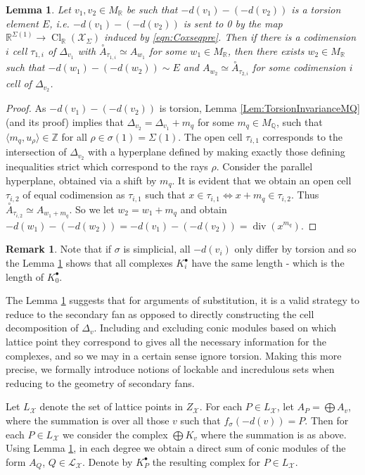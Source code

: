 \documentclass[reqno, 12pt]{amsart}
\newtheorem{lemma}[theorem]{Lemma}
\theoremstyle{definition}
\newtheorem{remark}[theorem]{Remark}
\numberwithin{equation}{section}
\newcommand{\Z}{\mathbb{Z}}
\newcommand{\R}{\mathbb{R}}
\newcommand{\Q}{\mathbb{Q}}
\newcommand{\opA}{\overset{\circ}{A}}
\begin{document}
\begin{lemma}
    \label{Lem:TorsionCellsPropagate}
    Let $v_1, v_2\in M_\R$ be such that $-d(v_1)-(-d(v_2))$ is a torsion element $E$, i.e. $-d(v_1)-(-d(v_2))$ is sent to 0 by the map $\R^{\Sigma(1)}\rightarrow \operatorname{Cl}_\R(\mathcal{X}_\Sigma)$ induced by \ref{eqn:Coxseqpre}. Then if there is a codimension $i$ cell $\tau_{1,i}$ of $\Delta_{v_1}$ with $\opA_{\tau_{1,i}}\simeq A_{w_1}$ for some $w_1\in M_\R$, then there exists $w_2\in M_\R$ such that $-d(w_1)-(-d(w_2))\sim E$ and $A_{w_2}\simeq \opA_{\tau_{2,i}}$ for some codimension $i$ cell of $\Delta_{v_2}$.
\end{lemma}
\begin{proof}
    As $-d(v_1)-(-d(v_2))$ is torsion, Lemma \ref{Lem:TorsionInvarianceMQ} (and its proof) implies that $\Delta_{v_2}=\Delta_{v_1}+m_q$ for some $m_q\in M_\Q$, such that $\langle m_q, u_\rho\rangle\in\Z$ for all $\rho\in\sigma(1)=\Sigma(1)$. The open cell $\tau_{i,1}$ corresponds to the intersection of $\Delta_{v_2}$ with a hyperplane defined by making exactly those defining inequalities strict which correspond to the rays $\rho$. Consider the parallel hyperplane, obtained via a shift by $m_q$. It is evident that we obtain an open cell $\tau_{i,2}$ of equal codimension as $\tau_{i,1}$ such that $x\in \tau_{i,1}\Leftrightarrow x+m_q\in \tau_{i,2}$. Thus $\opA_{\tau_{i,2}}\simeq A_{w_1+m_q}$. So we let $w_2=w_1+m_q$ and obtain $-d(w_1)-(-d(w_2))=-d(v_1)-(-d(v_2))=\operatorname{div}(x^{m_q})$.
\end{proof}

\begin{remark}
    Note that if $\sigma$ is simplicial, all $-d(v_i)$ only differ by torsion and so the Lemma \ref{Lem:TorsionCellsPropagate} shows that all complexes $K_i^\bullet$ have the same length -  which is the length of $K_0^\bullet$. 
\end{remark}

The Lemma \ref{Lem:TorsionCellsPropagate} suggests that for arguments of substitution, it is a valid strategy to reduce to the secondary fan as opposed to directly constructing the cell decomposition of $\Delta_v$. Including and excluding conic modules based on which lattice point they correspond to gives all the necessary information for the complexes, and so we may in a certain sense ignore torsion. Making this more precise, we formally introduce notions of lockable and incredulous sets when reducing to the geometry of secondary fans.

\noindent Let $L_\mathcal{X}$ denote the set of lattice points in $Z_\mathcal{X}$. For each $P\in L_\mathcal{X}$, let $A_P=\bigoplus A_v$, where the summation is over all those $v$ such that $f_\sigma(-d(v))=P$. Then for each $P\in L_\mathcal{X}$ we consider the complex $\bigoplus K_v$ where the summation is as above. Using Lemma \ref{Lem:TorsionCellsPropagate}, in each degree we obtain a direct sum of conic modules of the form $A_Q$, $Q\in \mathcal{L}_\mathcal{X}$. Denote by $K_P^\bullet$ the resulting complex for $P\in L_\mathcal{X}$.
\end{document}
